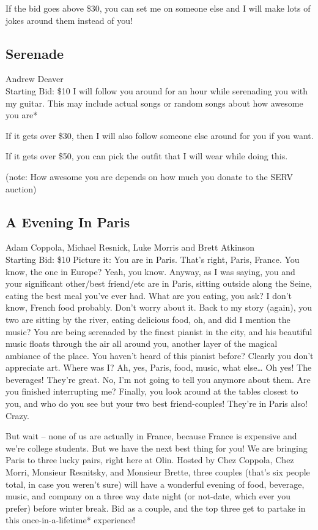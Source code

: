 \documentclass[11pt]{article}
\begin{document}
If the bid goes above \$30, you can set me on someone else and I will make lots of jokes around them instead of you!
\subsection{Serenade}
Andrew Deaver
\\
Starting Bid: \$10
\newline
I will follow you around for an hour while serenading you with my guitar. This may include actual songs or random songs about how awesome you are*

If it gets over \$30, then I will also follow someone else around for you if you want.

If it gets over \$50, you can pick the outfit that I will wear while doing this.

(note: How awesome you are depends on how much you donate to the SERV auction)
\subsection{A Evening In Paris}
Adam Coppola, Michael Resnick, Luke Morris and Brett Atkinson
\\
Starting Bid: \$10
\newline
Picture it: You are in Paris. That’s right, Paris, France. You know, the one in Europe? Yeah, you know. Anyway, as I was saying, you and your significant other/best friend/etc are in Paris, sitting outside along the Seine, eating the best meal you've ever had. What are you eating, you ask? I don’t know, French food probably. Don’t worry about it. Back to my story (again), you two are sitting by the river, eating delicious food, oh, and did I mention the music? You are being serenaded by the finest pianist in the city, and his beautiful music floats through the air all around you, another layer of the magical ambiance of the place. You haven’t heard of this pianist before? Clearly you don’t appreciate art. Where was I? Ah, yes, Paris, food, music, what else… Oh yes! The beverages! They’re great. No, I’m not going to tell you anymore about them. Are you finished interrupting me? Finally, you look around at the tables closest to you, and who do you see but your two best friend-couples! They’re in Paris also! Crazy. 
 
But wait – none of us are actually in France, because France is expensive and we’re college students. But we have the next best thing for you! We are bringing Paris to three lucky pairs, right here at Olin. Hosted by Chez Coppola, Chez Morri, Monsieur Resnitsky, and Monsieur Brette, three couples (that’s six people total, in case you weren't sure) will have a wonderful evening of food, beverage, music, and company on a three way date night (or not-date, which ever you prefer) before winter break. Bid as a couple, and the top three get to partake in this once-in-a-lifetime* experience!
\end{document}
